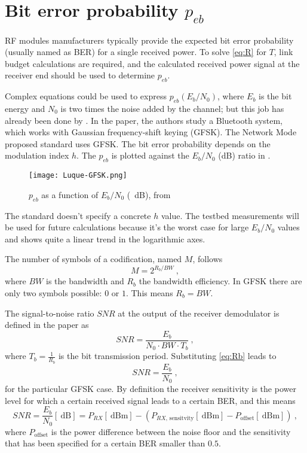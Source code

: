 \section{Bit error probability $p_{eb}$}
RF modules manufacturers typically provide the expected bit error probability (usually named as BER) for a single received power. To solve \eqref{eq:R} for $T$, link budget calculations are required, and the calculated received power signal at the receiver end should be used to determine $p_{eb}$.

Complex equations could be used to express $p_{eb} \left( E_b/N_0 \right)$, where $E_b$ is the bit energy and $N_0$ is two times the noise added by the channel; but this job has already been done by \textcite{Luque2012}. In the paper, the authors study a Bluetooth system, which works with Gaussian frequency-shift keying (GFSK). The Network Mode proposed standard uses GFSK. The bit error probability depends on the modulation index $h$. The $p_{eb}$ is plotted against the $E_b/N_0$ (dB) ratio in .
\begin{figure}[H] \centering
	\texttt{[image: Luque-GFSK.png]}
	\caption{$p_{eb}$ as a function of $E_b/N_0$ (\SI{}{\dB}), from \textcite{Luque2012}}
	\label{fig:Luque-GFSK-png}
\end{figure}
The standard doesn't specify a concrete $h$ value. The testbed measurements will be used for future calculations because it's the worst case for large $E_b / N_0$ values and shows quite a linear trend in the logarithmic axes.

The number of symbols of a codification, named $M$, follows
\begin{equation}
	M = 2^{R_b/BW} \ ,
	\label{eq:Rb}
\end{equation}
where $BW$ is the bandwidth and $R_b$ the bandwidth efficiency. In GFSK there are only two symbols possible: $0$ or $1$. This means $R_b = BW$. 

The signal-to-noise ratio $SNR$ at the output of the receiver demodulator is defined in the paper as
\begin{equation}
	SNR = \frac{E_b}{N_0 \cdot BW \cdot T_b} \ ,
\end{equation}
where $T_b = \frac{1}{R_b}$ is the bit transmission period. Substituting \eqref{eq:Rb} leads to
\begin{equation}
	SNR = \frac{E_b}{N_0} \ ,
\end{equation}
for the particular GFSK case. By definition the receiver sensitivity is the power level for which a certain received signal leads to a certain BER, and this means
\begin{equation}
	SNR = \frac{E_b}{N_0} \left[ \SI{}{\dB} \right]  = P_{RX} \left[ \SI{}{\dB}\text{m} \right]   - \left( P_{RX\text{, sensitvity}} \left[ \SI{}{\dB}\text{m} \right] - P_{\text{offset}} \left[ \SI{}{\dB}\text{m} \right] \right)   \ ,
\end{equation}
% 
where $P_{\text{offset}}$ is the power difference between the noise floor and the sensitivity that has been specified for a certain BER smaller than $0.5$.

